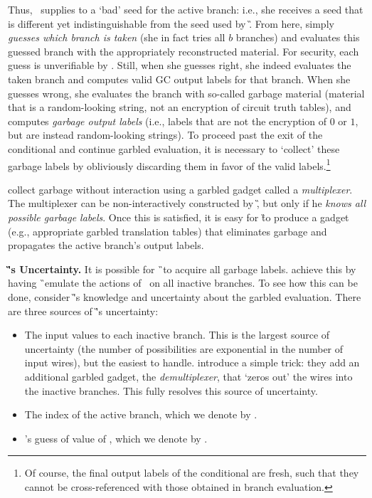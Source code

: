 Thus, \HK\ supplies to \E a `bad' seed for the active branch: i.e.,
she receives a seed that is different yet indistinguishable from the
seed used by \G.
From here, \E
simply \emph{guesses which branch is taken} (she in fact tries  all $b$
branches) and evaluates this guessed branch with the appropriately reconstructed material.
For security, each guess is unverifiable by \E. 
Still, when she guesses right, she indeed evaluates the taken branch and
computes valid GC output labels for that branch.
When she guesses wrong, she evaluates the branch
with so-called garbage material (material that is a random-looking string, not
an encryption of circuit truth tables), and computes
\emph{garbage output labels} (i.e., labels that are not the encryption
of $0$ or $1$, but are instead random-looking strings).
%
To proceed past the exit of the conditional and continue garbled evaluation, it is necessary to
`collect'  these garbage labels by obliviously  discarding them in favor of the valid
labels.\footnote{Of course, the final output labels of the conditional
  are fresh,  such that they cannot be cross-referenced with those
obtained in branch evaluation.}


\HK collect garbage without
interaction using a garbled gadget called a \emph{multiplexer}.
%
The multiplexer can be non-interactively constructed by \G,
but only if he \emph{knows all possible garbage labels}.
Once this is satisfied, it is easy for \G to produce a gadget
(e.g., appropriate garbled translation tables)
that eliminates garbage and propagates the active branch's output
labels.


{\bf \G's Uncertainty.}
It is possible for \G\ to acquire all garbage labels.
\HK achieve this by having \G\ emulate the actions of \E\
 on all inactive branches.
To see how this can be done,
 consider \G's knowledge and uncertainty about the garbled evaluation.
 There are three sources of \G's uncertainty:
\begin{itemize}
  \item The input values to each inactive branch.
    This is the largest source of uncertainty (the number of
    possibilities are exponential in the number of input wires), but
    the easiest to handle.  \HK introduce a simple trick:
    they add an additional garbled gadget, the \emph{demultiplexer},
    that `zeros out' the wires into the inactive branches.
    This fully resolves this source of uncertainty.
  \item The index of the active branch, which we denote by \truth.
  \item \E's guess of value of \truth, which we denote by \guess.
\end{itemize}

